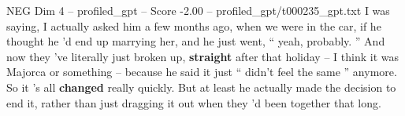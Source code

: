 \begin{textsample}{NEG Dim 4 – profiled\_gpt – Score -2.00 – profiled\_gpt/t000235\_gpt.txt}  \label{ex:f4_neg_012}
I was saying, I actually asked him a few months ago, when we were in the car, if he thought he ’d end up marrying her, and he just went, “ yeah, probably. ” And now they ’ve literally just broken up, \textbf{straight} after that holiday – I think it was Majorca or something – because he said it just “ didn't feel the same ” anymore.
So it ’s all \textbf{changed} really quickly.
But at least he actually made the decision to end it, rather than just dragging it out when they ’d been together that long.

\end{textsample}
